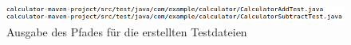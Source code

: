 \begin{figure}[h]
    \centering
    \includegraphics[width=1\textwidth]{Assets/Images/path.png}
    \caption{Ausgabe des Pfades für die erstellten Testdateien}
    \label{fig:path}
\end{figure}